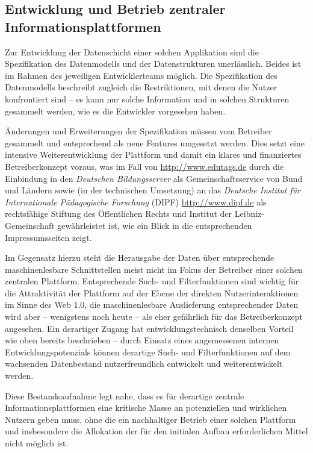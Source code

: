 \documentclass[a4paper,11pt]{article}
\begin{document}
\subsection{Entwicklung und Betrieb zentraler Informationsplattformen} 

Zur Entwicklung der Datenschicht einer solchen Applikation sind die
Spezifikation des Datenmodells und der Datenstrukturen unerlässlich.  Beides
ist im Rahmen des jeweiligen Entwicklerteams möglich. Die Spezifikation des
Datenmodells beschreibt zugleich die Restriktionen, mit denen die Nutzer
konfrontiert sind -- es kann nur solche Information und in solchen Strukturen
gesammelt werden, wie es die Entwickler vorgesehen haben.

Änderungen und Erweiterungen der Spezifikation müssen vom Betreiber gesammelt
und entsprechend als neue Features umgesetzt werden.  Dies setzt eine intensive
Weiterentwicklung der Plattform und damit ein klares und finanziertes
Betreiberkonzept voraus, was im Fall von \url{http://www.edutags.de} durch die
Einbindung in den \emph{Deutschen Bildungsserver} als Gemeinschaftsservice von
Bund und Ländern sowie (in der technischen Umsetzung) an das \emph{Deutsche
  Institut für Internationale Pädagogische Forschung} (DIPF)
\url{http://www.dipf.de} als rechtsfähige Stiftung des Öffentlichen Rechts und
Institut der Leibniz-Gemeinschaft gewährleistet ist, wie ein Blick in die
entsprechenden Impressumsseiten zeigt.  

Im Gegensatz hierzu steht die Herausgabe der Daten über entsprechende
maschinenlesbare Schnittstellen meist nicht im Fokus der Betreiber einer
solchen zentralen Plattform. Entsprechende Such- und Filterfunktionen sind
wichtig für die Attraktivität der Plattform auf der Ebene der direkten
Nutzerinteraktionen im Sinne des Web 1.0, die maschinenlesbare Auslieferung
entsprechender Daten wird aber -- wenigstens noch heute -- als eher gefährlich
für das Betreiberkonzept angesehen.  Ein derartiger Zugang hat
entwicklungstechnisch denselben Vorteil wie oben bereits beschrieben -- durch
Einsatz eines angemessenen internen Entwicklungspotenzials können derartige
Such- und Filterfunktionen auf dem wachsenden Datenbestand nutzerfreundlich
entwickelt und weiterentwickelt werden. 

Diese Bestandsaufnahme legt nahe, dass es für derartige zentrale
Informationsplattformen eine kritische Masse an potenziellen und wirklichen
Nutzern geben muss, ohne die ein nachhaltiger Betrieb einer solchen Plattform
und insbesondere die Allokation der für den initialen Aufbau erforderlichen
Mittel nicht möglich ist.
\end{document}
